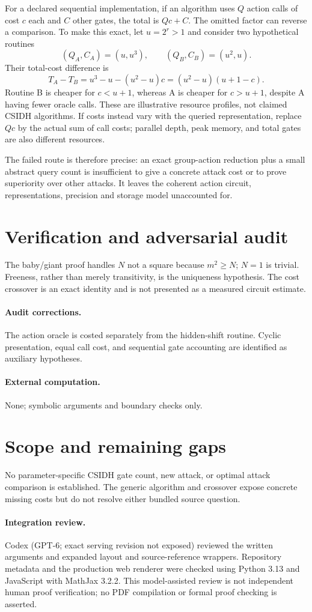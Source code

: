 \documentclass[11pt]{article}
\begin{document}
For a declared sequential implementation, if an algorithm uses $Q$ action calls of cost $c$ each and $C$ other gates, the total is $Qc+C$. The omitted factor can reverse a comparison. To make this exact, let $u=2^r>1$ and consider two hypothetical routines
\[
 (Q_A,C_A)=(u,u^3),\qquad (Q_B,C_B)=(u^2,u).
\]
Their total-cost difference is
\[
 T_A-T_B=u^3-u-(u^2-u)c=(u^2-u)(u+1-c).
\]
Routine B is cheaper for $c<u+1$, whereas A is cheaper for $c>u+1$, despite A having fewer oracle calls. These are illustrative resource profiles, not claimed CSIDH algorithms. If costs instead vary with the queried representation, replace $Qc$ by the actual sum of call costs; parallel depth, peak memory, and total gates are also different resources.

The failed route is therefore precise: an exact group-action reduction plus a small abstract query count is insufficient to give a concrete attack cost or to prove superiority over other attacks. It leaves the coherent action circuit, representations, precision and storage model unaccounted for.
\section{Verification and adversarial audit}
The baby/giant proof handles $N$ not a square because $m^2\geq N$; $N=1$ is trivial. Freeness, rather than merely transitivity, is the uniqueness hypothesis. The cost crossover is an exact identity and is not presented as a measured circuit estimate.
\paragraph{Audit corrections.} The action oracle is costed separately from the hidden-shift routine. Cyclic presentation, equal call cost, and sequential gate accounting are identified as auxiliary hypotheses.
\paragraph{External computation.} None; symbolic arguments and boundary checks only.
\section{Scope and remaining gaps}
No parameter-specific CSIDH gate count, new attack, or optimal attack comparison is established. The generic algorithm and crossover expose concrete missing costs but do not resolve either bundled source question.
\paragraph{Integration review.} Codex (GPT-6; exact serving revision not exposed) reviewed the written arguments and expanded layout and source-reference wrappers. Repository metadata and the production web renderer were checked using Python 3.13 and JavaScript with MathJax 3.2.2. This model-assisted review is not independent human proof verification; no PDF compilation or formal proof checking is asserted.
\end{document}
